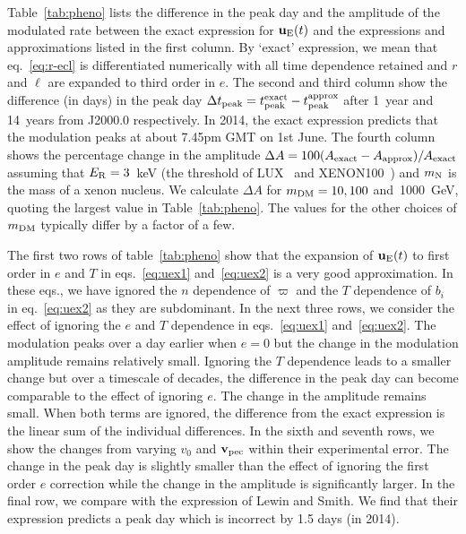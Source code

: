\documentclass[preprintnumbers,a4paper,twocolumn,floats,nofootinbib,superscriptaddress,aps,prd]{revtex4-1}
\begin{document}
Table~\ref{tab:pheno} lists the difference in the peak day and the amplitude of the modulated rate between the exact expression for $\mathbf{u}_{\rm{E}}(t)$ and the expressions and approximations listed in the first column. By `exact' expression, we mean that eq.~\eqref{eq:r-ecl} is differentiated numerically with all time dependence retained and $r$ and $\ell$ are expanded to third order in $e$. The second and third column show the difference (in days) in the peak day \mbox{$\Delta t_{\rm{peak}}=t^{\rm{exact}}_{\rm{peak}}-t^{\rm{approx}}_{\rm{peak}}$} after 1~year and 14~years from J2000.0 respectively. In 2014, the exact expression predicts that the modulation peaks at about 7.45pm GMT on 1st June.  The fourth column shows the percentage change in the amplitude \mbox{$\Delta A=100(A_{\rm{exact}}-A_{\rm{approx}})/A_{\rm{exact}}$} assuming that $E_{\rm{R}}=3$~keV (the threshold of LUX~\cite{Akerib:2013tjd} and XENON100~\cite{Aprile:2012nq}) and $m_{\rm{N}}$ is the mass of a xenon nucleus. We calculate $\Delta A$ for $m_{\rm{DM}}=10,100$ and~1000~GeV, quoting the largest value in Table~\ref{tab:pheno}. The values for the other choices of $m_{\rm{DM}}$ typically differ by a factor of a few.

The first two rows of table~\ref{tab:pheno} show that the expansion of $\mathbf{u}_{\rm{E}}(t)$ to first order in $e$ and $T$ in eqs.~\eqref{eq:uex1} and~\eqref{eq:uex2} is a very good approximation. In these eqs., we have ignored the $n$ dependence of $\varpi$ and the $T$ dependence of $b_i$ in eq.~\eqref{eq:uex2} as they are subdominant. In the next three rows, we consider the effect of ignoring the $e$ and $T$ dependence in eqs.~\eqref{eq:uex1} and~\eqref{eq:uex2}. The modulation peaks over a day earlier when $e=0$ but the change in the modulation amplitude remains relatively small. Ignoring the $T$ dependence leads to a smaller change but over a timescale of decades, the difference in the peak day can become comparable to the effect of ignoring $e$. The change in the amplitude remains small. When both terms are ignored, the difference from the exact expression is the linear sum of the individual differences. In the sixth and seventh rows, we show the changes from varying $v_0$ and $\mathbf{v}_{\rm{pec}}$ within their experimental error. The change in the peak day is slightly smaller than the effect of ignoring the first order $e$ correction while the change in the amplitude is significantly larger. In the final row, we compare with the expression of Lewin and Smith. We find that their expression predicts a peak day which is incorrect by 1.5 days (in 2014).
\end{document}
